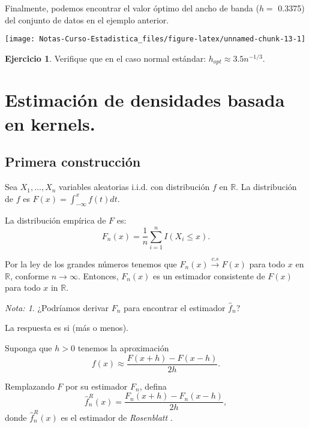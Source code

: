 \documentclass[
  12pt,
]{book}
\theoremstyle{definition}
\theoremstyle{definition}
\theoremstyle{definition}
\newtheorem{exercise}{Ejercicio}[chapter]
\theoremstyle{definition}
\theoremstyle{remark}
\newtheorem*{remark}{Nota: }
\begin{document}
Finalmente, podemos encontrar el valor óptimo del ancho de banda (\(h=\) 0.3375) del conjunto de datos en el ejemplo anterior.

\begin{center}\texttt{[image: Notas-Curso-Estadistica\_files/figure-latex/unnamed-chunk-13-1]} \end{center}

\begin{exercise}
\protect\hypertarget{exr:unnamed-chunk-14}{}\label{exr:unnamed-chunk-14}Verifique que en el caso normal estándar: \(h_{opt}\approx 3.5 n^{-1/3}\).
\end{exercise}

\hypertarget{estimaciuxf3n-de-densidades-basada-en-kernels.}{%
\section{Estimación de densidades basada en kernels.}\label{estimaciuxf3n-de-densidades-basada-en-kernels.}}

\hypertarget{primera-construcciuxf3n}{%
\subsection{Primera construcción}\label{primera-construcciuxf3n}}

Sea \(X_{1},\ldots,X_{n}\) variables aleatorias i.i.d. con distribución \(f\) en \(\mathbb{R}\). La distribución de \(f\) es \(F(x)=\int_{-\infty}^{x}f(t)dt\).

La distribución empírica de \(F\) es:
\[
F_{n}(x)=\frac{1}{n}\sum_{i=1}^{n}I(X_{i}\leq x).
\]

Por la ley de los grandes números tenemos que \(F_{n}(x) \xrightarrow{c.s} F(x)\) para todo \(x\) en \(\mathbb{R}\), conforme
\(n\rightarrow\infty\). Entonces, \(F_{n}(x)\) es un estimador consistente de \(F(x)\) para todo \(x\) in \(\mathbb{R}\).

\begin{remark}
¿Podríamos derivar \(F_n\) para encontrar el estimador \(\hat{f}_n\)?
\end{remark}

La respuesta es si (más o menos).

Suponga que \(h>0\) tenemos la aproximación
\[
f(x)\approx\frac{F(x+h)-F(x-h)}{2h}.
\]

Remplazando \(F\) por su estimador \(F_{n}\), defina
\[
\hat{f}_{n}^{R}(x)=\frac{F_{n}(x+h)-F_{n}(x-h)}{2h},
\]
donde \(\hat{f}_{n}^{R}(x)\) es el estimador de \emph{Rosenblatt} .
\end{document}
